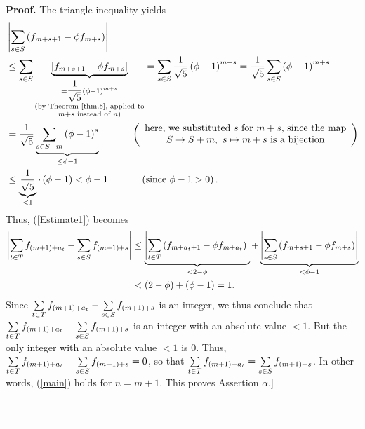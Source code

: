 \documentclass[numbers=enddot,12pt,final,onecolumn,notitlepage]{scrartcl}%
\numberwithin{exer}{section}
\theoremstyle{definition}
\newenvironment{proof}[1][Proof]{\noindent\textbf{#1.} }{\ \rule{0.5em}{0.5em}}
\let\sumnonlimits\sum
\renewcommand{\sum}{\sumnonlimits\limits}
\begin{document}
\begin{proof}
The triangle inequality yields%
\begin{align*}
&  \left\vert \sum\limits_{s\in S}\left(  f_{m+s+1}-\phi f_{m+s}\right)
\right\vert \\
&  \leq\sum\limits_{s\in S}\underbrace{\left\vert f_{m+s+1}-\phi
f_{m+s}\right\vert }_{\substack{=\dfrac{1}{\sqrt{5}}\left(  \phi-1\right)
^{m+s}\\\text{(by Theorem~\ref{thm.6}, applied to}\\m+s\text{ instead of
}n\text{)}}}=\sum\limits_{s\in S}\dfrac{1}{\sqrt{5}}\left(  \phi-1\right)
^{m+s}=\dfrac{1}{\sqrt{5}}\sum\limits_{s\in S}\left(  \phi-1\right)  ^{m+s}\\
&  =\dfrac{1}{\sqrt{5}}\underbrace{\sum\limits_{s\in S+m}\left(
\phi-1\right)  ^{s}}_{\leq\phi-1}\ \ \ \ \ \ \ \ \ \ \left(
\begin{array}
[c]{c}%
\text{here, we substituted }s\text{ for }m+s\text{, since the map}\\
S\rightarrow S+m,\ s\mapsto m+s\text{ is a bijection}%
\end{array}
\right) \\
&  \leq\underbrace{\dfrac{1}{\sqrt{5}}}_{<1}\cdot\left(  \phi-1\right)
<\phi-1\ \ \ \ \ \ \ \ \ \ \left(  \text{since }\phi-1>0\right)  .
\end{align*}
Thus, (\ref{Estimate1}) becomes%
\begin{align}
\left\vert \sum\limits_{t\in T}f_{\left(  m+1\right)  +a_{t}}-\sum
\limits_{s\in S}f_{\left(  m+1\right)  +s}\right\vert  &  \leq
\underbrace{\left\vert \sum\limits_{t\in T}\left(  f_{m+a_{t}+1}-\phi
f_{m+a_{t}}\right)  \right\vert }_{<2-\phi}+\underbrace{\left\vert
\sum\limits_{s\in S}\left(  f_{m+s+1}-\phi f_{m+s}\right)  \right\vert
}_{<\phi-1}\nonumber\\
&  <\left(  2-\phi\right)  +\left(  \phi-1\right)  =1.\nonumber
\end{align}
Since $\sum\limits_{t\in T}f_{\left(  m+1\right)  +a_{t}}-\sum\limits_{s\in
S}f_{\left(  m+1\right)  +s}$ is an integer, we thus conclude that
$\sum\limits_{t\in T}f_{\left(  m+1\right)  +a_{t}}-\sum\limits_{s\in
S}f_{\left(  m+1\right)  +s}$ is an integer with an absolute value $<1$. But
the only integer with an absolute value $<1$ is $0$. Thus, $\sum\limits_{t\in
T}f_{\left(  m+1\right)  +a_{t}}-\sum\limits_{s\in S}f_{\left(  m+1\right)
+s}=0$, so that $\sum\limits_{t\in T}f_{\left(  m+1\right)  +a_{t}}%
=\sum\limits_{s\in S}f_{\left(  m+1\right)  +s}$. In other words, (\ref{main})
holds for $n=m+1$. This proves Assertion $\alpha$.]


\end{proof}
\end{document}
